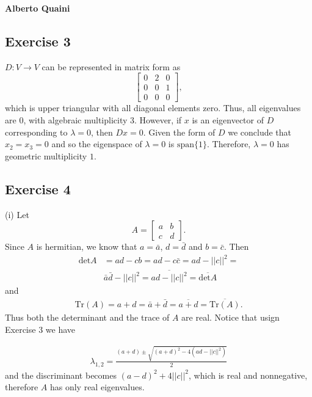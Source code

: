 \documentclass[11.5pt, letterpaper, bibtotoc,
    tablecaptionabove, figurecaptionabove]{article}
\begin{document}
\textbf{Alberto Quaini}

\subsection*{Exercise 3}
$D:V\to V$ can be represented in matrix form as
\begin{equation*}
    \begin{bmatrix}
        0 & 2 & 0\\
        0 & 0 & 1\\
        0 & 0 & 0
    \end{bmatrix},
\end{equation*}
which is upper triangular with all diagonal elements zero.
Thus, all eigenvalues are $0$, with algebraic multiplicity $3$.
However, if $x$ is an eigenvector of $D$ corresponding to $\lambda = 0$,
then $Dx=0$.
Given the form of $D$ we conclude that $x_2=x_3=0$ and so the eigenspace
of $\lambda=0$ is $\text{span}\{1\}$.
Therefore, $\lambda=0$ has geometric multiplicity $1$.

\subsection*{Exercise 4}
(i)
Let
\begin{equation*}
    A = 
    \begin{bmatrix}
        a & b\\
        c & d
    \end{bmatrix}.
\end{equation*}
Since $A$ is hermitian, we know that $a = \bar{a}$, $d = \bar{d}$ and $b = \bar{c}$.
Then 
\begin{align*}
    \text{det}A &= ad - cb = ad - c\bar{c} = ad - ||c||^2 =\\
    &\bar{a}\bar{d}-||c||^2 = \overline{ad - ||c||^2}=\overline{\text{det}A}
\end{align*}    
and 
\begin{align*}
    \text{Tr}(A) = a + d = \bar{a} + \bar{d} = \overline{a + d} = \overline{\text{Tr}(A)}.
\end{align*}
Thus both the determinant and the trace of $A$ are real.
Notice that usign Exercise $3$ we have 

\begin{align*}
    \lambda_{1,2} = \frac{(a + d) \pm \sqrt{(a + d)^2 - 4(ad-||c||^2)}}{2}
\end{align*}
and the discriminant becomes $(a-d)^2 + 4||c||^2$, which is real and nonnegative,
therefore $A$ has only real eigenvalues.
\end{document}
